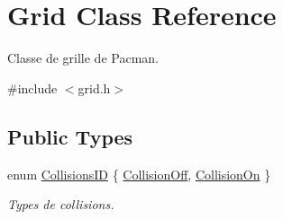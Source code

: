 \hypertarget{class_grid}{}\section{Grid Class Reference}
\label{class_grid}


Classe de grille de Pacman.  




{\ttfamily \#include $<$grid.\+h$>$}

\subsection*{Public Types}
\begin{DoxyCompactItemize}
\item 
enum \hyperlink{class_grid_a473f8c5d768a1734d8911bf1213ce10f}{Collisions\+I\+D} \{ \hyperlink{class_grid_a473f8c5d768a1734d8911bf1213ce10fa0a40927bb14a23a6aeb090abe9bfb517}{Collision\+Off}, 
\hyperlink{class_grid_a473f8c5d768a1734d8911bf1213ce10fa2b394e743be772d4a1da354d5b597623}{Collision\+On}
 \}\begin{DoxyCompactList}\small\item\em Types de collisions. \end{DoxyCompactList}
\end{DoxyCompactItemize}
